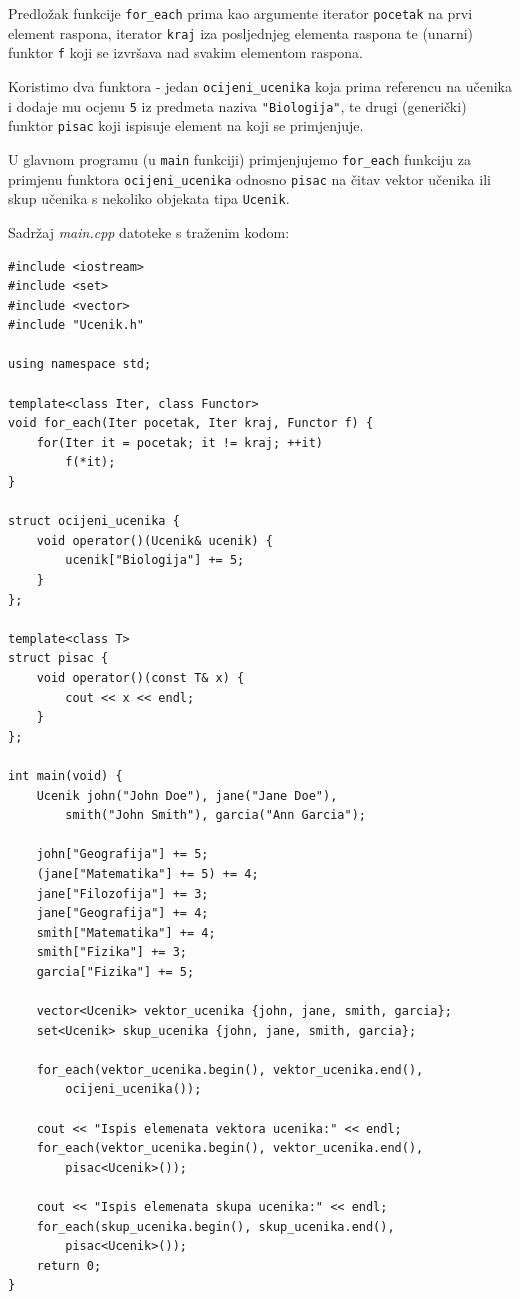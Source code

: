 \begin{rjesenje}
Predložak funkcije \texttt{for\_each} prima kao argumente
iterator \texttt{pocetak} na prvi element raspona,
iterator \texttt{kraj} iza posljednjeg elementa raspona
te (unarni) funktor \texttt{f} koji se izvršava nad svakim elementom raspona.
\medskip


Koristimo dva funktora - jedan \texttt{ocijeni\_ucenika}
koja prima referencu na učenika i dodaje mu ocjenu \texttt{5} iz predmeta naziva \texttt{"Biologija"},
te drugi (generički) funktor \texttt{pisac} koji ispisuje element na koji se primjenjuje.
\medskip

U glavnom programu (u \texttt{main} funkciji) primjenjujemo \texttt{for\_each} funkciju za primjenu funktora
\texttt{ocijeni\_ucenika} odnosno \texttt{pisac}
na čitav vektor učenika ili skup učenika s nekoliko objekata tipa \texttt{Ucenik}.
\medskip

Sadržaj \textit{main.cpp} datoteke s traženim kodom:
\begin{verbatim}
#include <iostream>
#include <set>
#include <vector>
#include "Ucenik.h"

using namespace std;

template<class Iter, class Functor>
void for_each(Iter pocetak, Iter kraj, Functor f) {
    for(Iter it = pocetak; it != kraj; ++it)
        f(*it);
}

struct ocijeni_ucenika {
    void operator()(Ucenik& ucenik) {
        ucenik["Biologija"] += 5;
    }
};

template<class T>
struct pisac {
    void operator()(const T& x) {
        cout << x << endl;
    }
};

int main(void) {
    Ucenik john("John Doe"), jane("Jane Doe"),
        smith("John Smith"), garcia("Ann Garcia");
		
    john["Geografija"] += 5;
    (jane["Matematika"] += 5) += 4;
    jane["Filozofija"] += 3;
    jane["Geografija"] += 4;
    smith["Matematika"] += 4;
    smith["Fizika"] += 3;
    garcia["Fizika"] += 5;

    vector<Ucenik> vektor_ucenika {john, jane, smith, garcia};
    set<Ucenik> skup_ucenika {john, jane, smith, garcia};

    for_each(vektor_ucenika.begin(), vektor_ucenika.end(),
        ocijeni_ucenika());
    
    cout << "Ispis elemenata vektora ucenika:" << endl;
    for_each(vektor_ucenika.begin(), vektor_ucenika.end(),
        pisac<Ucenik>());
		
    cout << "Ispis elemenata skupa ucenika:" << endl;
    for_each(skup_ucenika.begin(), skup_ucenika.end(),
        pisac<Ucenik>());
    return 0;
}
\end{verbatim}
\end{rjesenje}


